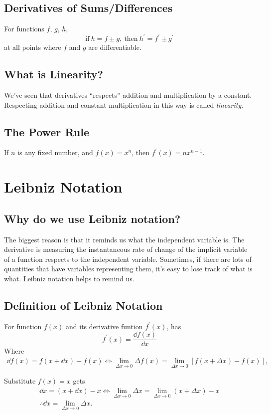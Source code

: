 \subsection{Derivatives of Sums/Differences}
For functions $f$, $g$, $h$,
\[\text{if}\ h=f\pm g,\ \text{then}\ h^\prime=f^\prime\pm g^\prime\]
at all points where $f$ and $g$ are differentiable.

\subsection{What is Linearity?}
We've seen that derivatives ``respects'' addition and multiplication by a constant. Respecting addition and constant multiplication in this way is called \textit{linearity}.

\subsection{The Power Rule}
If $n$ is any fixed number, and $f(x)=x^n$, then $f^\prime(x)=nx^{n-1}$.

\section{Leibniz Notation}
\subsection{Why do we use Leibniz notation?}
The biggest reason is that it reminds us what the independent variable is. The derivative is measuring the instantaneous rate of change of the implicit variable of a function respects to the independent variable. Sometimes, if there are lots of quantities that have variables representing them, it's easy to lose track of what is what. Leibniz notation helps to remind us.

\subsection{Definition of Leibniz Notation}
For function $f(x)$ and its derivative funtion $f^\prime(x)$, has
\[f^\prime(x)=\frac{\dd f(x)}{\dd x}\]
Where
\begin{gather*}
\dd f(x)=f(x+\dd x)-f(x)\iff\lim_{\Delta x\to0}\Delta f(x)=\lim_{\Delta x\to0}[f(x+\Delta x)-f(x)],
\end{gather*}
\begin{corollary}[$\dd x=\lim_{\Delta x\to0}\Delta x$]
  Substitute $f(x)=x$ gets
  \begin{gather*}
    \dd x=(x+\dd x)-x\iff\lim_{\Delta x\to0}\Delta x=\lim_{\Delta x\to0}(x+\Delta x)-x\\
    \therefore\dd x=\lim_{\Delta x\to0}\Delta x.
  \end{gather*}
\end{corollary}
